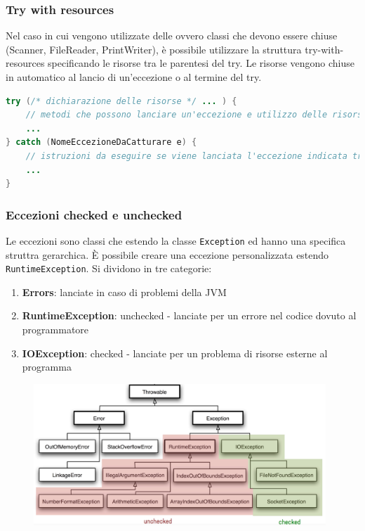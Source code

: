 \documentclass{article}
\begin{document}
\subsubsection*{Try with resources}
Nel caso in cui vengono utilizzate delle  ovvero classi che devono essere chiuse (Scanner, FileReader, PrintWriter),
è possibile utilizzare la struttura try-with-resources specificando le risorse tra le parentesi del try. Le risorse vengono chiuse
in automatico al lancio di un'eccezione o al termine del try.
\begin{lstlisting}[language=Java]
try (/* dichiarazione delle risorse */ ... ) {
	// metodi che possono lanciare un'eccezione e utilizzo delle risorse
	...
} catch (NomeEccezioneDaCatturare e) {
	// istruzioni da eseguire se viene lanciata l'eccezione indicata tra parentesi
	...
}
\end{lstlisting}

\subsubsection*{Eccezioni checked e unchecked}
Le eccezioni sono classi che estendo la classe \verb|Exception| ed hanno una specifica struttra gerarchica. È possibile creare
una eccezione personalizzata estendo \verb|RuntimeException|. Si dividono in tre categorie:
\begin{enumerate} [topsep=3pt, itemsep=0pt]
	\item \textbf{Errors}: lanciate in caso di problemi della JVM
	\item \textbf{RuntimeException}: unchecked - lanciate per un errore nel codice dovuto al programmatore
	\item \textbf{IOException}: checked - lanciate per un problema di risorse esterne al programma
\end{enumerate}

\begin{figure}[h]
	\centering
	\includegraphics[width=11cm]{eccezioni.png}
\end{figure}
\end{document}
